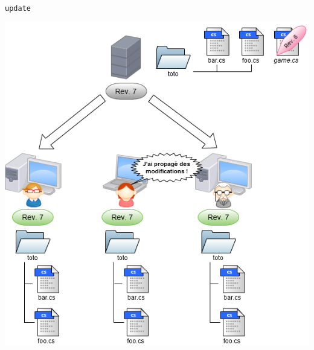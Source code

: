 \begin{frame}
  \texttt{update}
  \begin{center}
    \vspace{-12pt}
    \includegraphics[scale=0.3]{images/11-Update.png}
  \end{center}
\end{frame}

